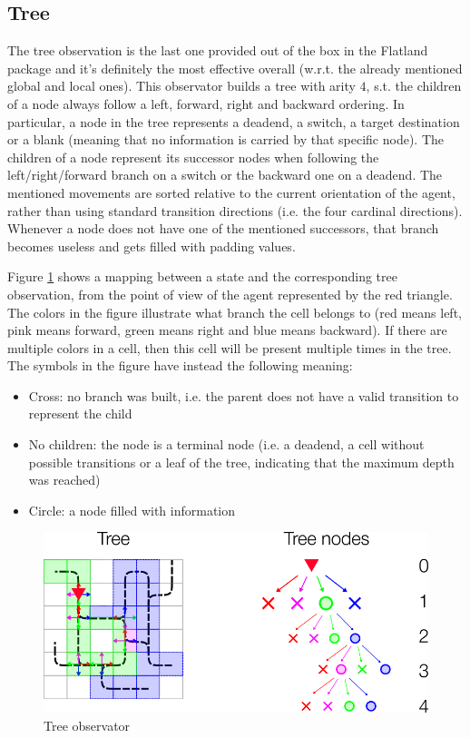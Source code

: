\documentclass[a4paper,10pt]{report}
\begin{document}
\subsection{Tree}\label{subsec:tree-obs}
The tree observation is the last one provided out of the box in the Flatland package and it's definitely the most effective overall (w.r.t. the already mentioned global and local ones). This observator builds a tree with arity $4$, s.t. the children of a node always follow a left, forward, right and backward ordering. In particular, a node in the tree represents a deadend, a switch, a target destination or a blank (meaning that no information is carried by that specific node). The children of a node represent its successor nodes when following the left/right/forward branch on a switch or the backward one on a deadend. The mentioned movements are sorted relative to the current orientation of the agent, rather than using standard transition directions (i.e. the four cardinal directions). Whenever a node does not have one of the mentioned successors, that branch becomes useless and gets filled with padding values.

Figure \ref{fig:tree-obs} shows a mapping between a state and the corresponding tree observation, from the point of view of the agent represented by the red triangle. The colors in the figure illustrate what branch the cell belongs to (red means left, pink means forward, green means right and blue means backward). If there are multiple colors in a cell, then this cell will be present multiple times in the tree. The symbols in the figure have instead the following meaning:
\begin{itemize}
	\item Cross: no branch was built, i.e. the parent does not have a valid transition to represent the child
	\item No children: the node is a terminal node (i.e. a deadend, a cell without possible transitions or a leaf of the tree, indicating that the maximum depth was reached)
	\item Circle: a node filled with information
\end{itemize}

\begin{figure}[h]
	\includegraphics[width=\textwidth]{tree-obs.png}
	\caption{Tree observator}
	\label{fig:tree-obs}
\end{figure}
\end{document}
